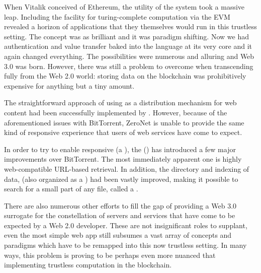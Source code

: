 When Vitalik conceived of Ethereum, the utility of the system took a massive leap. Including the facility for turing-complete computation via the EVM revealed a horizon of applications that they themselves would run in this trustless setting. The concept was as brilliant and it was paradigm shifting. Now we had authentication and value transfer baked into the language at its very core and it again changed everything. The possibilities were numerous and alluring and Web 3.0 was born. However, there was still a problem to overcome when transcending fully from the Web 2.0 world: storing data on the blockchain was prohibitively expensive for anything but a tiny amount.

The straightforward approach of using  as a distribution mechanism for web content had been successfully implemented by  \cite{zeronet}. However, because of the aforementioned issues with BitTorrent, ZeroNet is unable to provide the same kind of responsive experience that users of web services have come to expect. 

In order to try to enable responsive  (a ), the  () \cite{ipfs2014} has introduced a few major improvements over BitTorrent. The most immediately apparent one is highly web-compatible URL-based retrieval. In addition, the directory and indexing of data, (also organized as a ) had been vastly improved, making it possible to search for a small part of any file, called a .

There are also numerous other efforts to fill the gap of providing a Web 3.0 surrogate for the constellation of servers and services that have come to be expected by a Web 2.0 developer. These are not insignificant roles to supplant, even the most simple web app still subsumes a vast array of concepts and paradigms which have to be remapped into this now trustless setting. In many ways, this problem is proving to be perhaps even more nuanced that implementing trustless computation in the blockchain.

